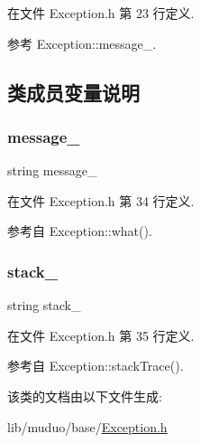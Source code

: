 在文件 Exception.\+h 第 23 行定义.



参考 Exception\+::message\+\_\+.



\subsection{类成员变量说明}
\mbox{\label{classmuduo_1_1Exception_a44d903a81178bdfff6c6c0c0c72942aa}} 
\subsubsection{\texorpdfstring{message\+\_\+}{message\_}}
{\footnotesize\ttfamily string message\+\_\+\hspace{0.3cm}{\ttfamily [private]}}



在文件 Exception.\+h 第 34 行定义.



参考自 Exception\+::what().

\mbox{\label{classmuduo_1_1Exception_a648d7500eca035b90d3f4653d2bc6164}} 
\subsubsection{\texorpdfstring{stack\+\_\+}{stack\_}}
{\footnotesize\ttfamily string stack\+\_\+\hspace{0.3cm}{\ttfamily [private]}}



在文件 Exception.\+h 第 35 行定义.



参考自 Exception\+::stack\+Trace().



该类的文档由以下文件生成\+:\begin{DoxyCompactItemize}
\item 
lib/muduo/base/\hyperlink{Exception_8h}{Exception.\+h}\end{DoxyCompactItemize}
